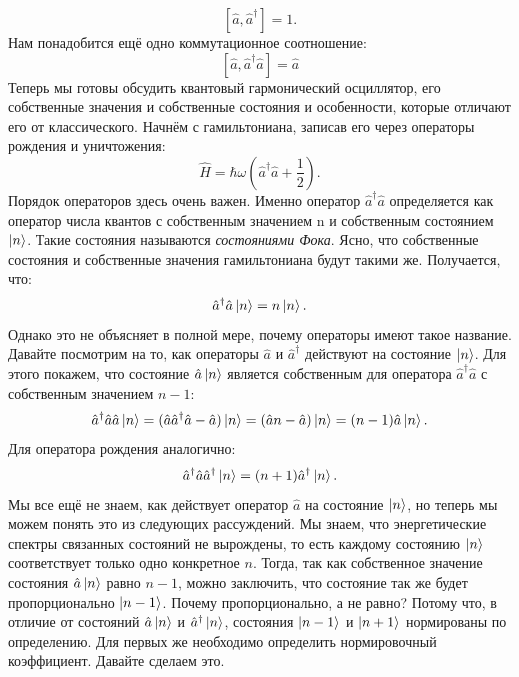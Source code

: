 \[
[\hat{a}, \hat{a}^{\dagger}] = 1.
\]
Нам понадобится ещё одно коммутационное соотношение:
\[
[\hat{a}, \hat{a}^{\dagger}\hat{a}] = \hat{a}
\]
Теперь мы готовы обсудить квантовый гармонический осциллятор, его собственные значения и собственные состояния и особенности, которые отличают его от классического. Начнём с гамильтониана, записав его через операторы рождения и уничтожения:
\[
\hat{H} = \hbar\omega\left( \hat{a}^{\dagger}\hat{a} + \frac{1}{2}\right).
\]
Порядок операторов здесь очень важен. Именно оператор $\hat{a}^{\dagger}\hat{a}$ определяется как оператор числа квантов с собственным значением n и собственным состоянием $\ket{n}$. Такие состояния называются \textit{состояниями Фока}. Ясно, что собственные состояния и собственные значения гамильтониана будут такими же. Получается, что:
\[
\hat{a}^{\dagger}\hat{a}\ket{n} = n\ket{n}.
\]
Однако это не объясняет в полной мере, почему операторы имеют такое название. Давайте посмотрим на то, как операторы $\hat{a}$ и $\hat{a}^{\dagger}$ действуют на состояние $\ket{n}$. Для этого покажем, что состояние $\hat{a}\ket{n}$ является собственным для оператора $\hat{a}^{\dagger}\hat{a}$ с собственным значением $n-1$:
\[
\hat{a}^{\dagger}\hat{a}\hat{a}\ket{n} = (\hat{a}\hat{a}^{\dagger}\hat{a} - \hat{a})\ket{n} = (\hat{a}n - \hat{a})\ket{n} = (n-1)\hat{a}\ket{n}.
\]
Для оператора рождения аналогично:
\[
\hat{a}^{\dagger}\hat{a}\hat{a}^{\dagger}\ket{n} = (n+1)\hat{a}^{\dagger}\ket{n}.
\]
Мы все ещё не знаем, как действует оператор $\hat{a}$ на состояние $\ket{n}$, но теперь мы можем понять это из следующих рассуждений. Мы знаем, что энергетические спектры связанных состояний не вырождены, то есть каждому состоянию $\ket{n}$ соответствует только одно конкретное $n$. Тогда, так как собственное значение состояния $\hat{a}\ket{n}$ равно $n-1$, можно заключить, что состояние так же будет пропорционально $\ket{n-1}$. Почему пропорционально, а не равно? Потому что, в отличие от состояний $\hat{a}\ket{n}$ и $\hat{a}^{\dagger}\ket{n}$, состояния $\ket{n-1}$ и $\ket{n+1}$ нормированы по определению. Для первых же необходимо определить нормировочный коэффициент. Давайте сделаем это.

